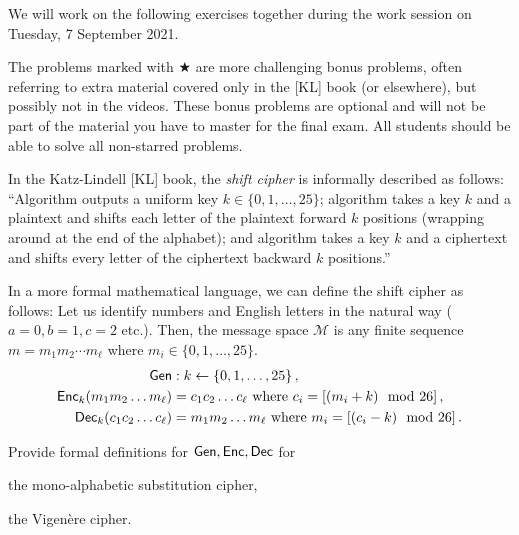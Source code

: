 \documentclass[a4paper,10pt,landscape,twocolumn]{scrartcl}
\begin{document}
\problems

{\sffamily\noindent
We will work on the following exercises together during the work session on Tuesday, 7 September 2021.

The problems marked with $\bigstar$ are more challenging bonus problems, often referring to extra material covered only in the [KL] book (or elsewhere), but possibly not in the videos. These bonus problems are optional and will not be part of the material you have to master for the final exam. All students should be able to solve all non-starred problems.
}

\begin{exercise}
In the Katz-Lindell [KL] book, the \emph{shift cipher} is informally described as follows: ``Algorithm \gen outputs a uniform key $k \in \{0,1,\ldots, 25\}$; algorithm \enc takes a key $k$ and a plaintext and shifts each letter of the plaintext forward $k$ positions (wrapping around at the end of the alphabet); and algorithm \dec takes a key $k$ and a ciphertext and shifts every letter of the ciphertext backward $k$ positions.''

In a more formal mathematical language, we can define the shift cipher as follows: Let us identify numbers and English letters in the natural way ($a=0, b=1, c=2$ etc.). Then, the message space $\mathcal{M}$ is any finite sequence $m=m_1 m_2 \cdots m_\ell$ where $m_i \in \{0,1,\ldots,25\}$.
\begin{align*}
\mathsf{Gen}&: k \leftarrow \{0,1,\ldots, 25\} \, ,\\
\mathsf{Enc}_k(m_1 m_2 \ldots m_\ell) &= c_1 c_2 \ldots c_\ell  \mbox{ where }c_i = [(m_i + k) \mod 26] \, ,\\
\mathsf{Dec}_k(c_1 c_2 \ldots c_\ell) &= m_1 m_2 \ldots m_\ell  \mbox{ where }m_i = [(c_i - k) \mod 26] \, .
\end{align*}

Provide formal definitions for $\mathsf{Gen}, \mathsf{Enc}, \mathsf{Dec}$ for
\begin{subex}
the mono-alphabetic substitution cipher,
\end{subex}
\begin{subex}
the Vigen{\`e}re cipher.
\end{subex}
\end{exercise}
\end{document}
